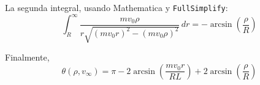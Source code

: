 \documentclass[]{article}
\numberwithin{equation}{section}
\newcommand{\0}{\textcolor{gray}{0}}
\begin{document}
\begin{enumerate}
\begin{enumerate}
		La segunda integral, usando Mathematica y \texttt{FullSimplify}:
		\begin{equation}
			\int_{R}^{\infty} \frac{m v_0 \rho}{r \sqrt{(m v_0 r)^2  - (m v_0 \rho)^2}} \, dr = - \arcsin\left(\frac{\rho}{R}\right)
		\end{equation}
		
		Finalmente,
		\begin{equation}
			\theta(\rho, v_\infty) =  \pi - 2 \arcsin\left(\frac{m v_0 r}{R L}\right) +  2 \arcsin\left(\frac{\rho}{R}\right)
		\end{equation}
	\end{enumerate}
\end{enumerate}
\end{document}
